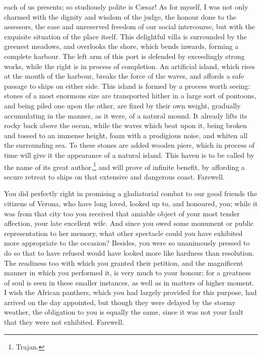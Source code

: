 each of us presents; so studiously polite is Cæsar! As for myself, I was
not only charmed with the dignity and wisdom of the judge, the honour done
to the assessors, the ease and unreserved freedom of our social
intercourse, but with the exquisite situation of the place itself. This
delightful villa is surrounded by the greenest meadows, and overlooks the
shore, which bends inwards, forming a complete harbour. The left arm of
this port is defended by exceedingly strong works, while the right is in
process of completion. An artificial island, which rises at the mouth of
the harbour, breaks the force of the waves, and affords a safe passage to
ships on either side. This island is formed by a process worth seeing:
stones of a most enormous size are transported hither in a large sort of
pontoons, and being piled one upon the other, are fixed by their own
weight, gradually accumulating in the manner, as it were, of a natural
mound. It already lifts its rocky back above the ocean, while the waves
which beat upon it, being broken and tossed to an immense height, foam
with a prodigious noise, and whiten all the surrounding sea. To these
stones are added wooden piers, which in process of time will give it the
appearance of a natural island. This haven is to be called by the name of
its great author,\footnote{Trajan.} and will prove of infinite benefit, by
affording a secure retreat to ships on that extensive and dangerous coast.
Farewell.


You did perfectly right in promising a gladiatorial combat to our good
friends the citizens of Verona, who have long loved, looked up to, and
honoured, you; while it was from that city too you received that amiable
object of your most tender affection, your late excellent wife. And since
you owed some monument or public representation to her memory, what other
spectacle could you have exhibited more appropriate to the occasion?
Besides, you were so unanimously pressed to do so that to have refused
would have looked more like hardness than resolution. The readiness too
with which you granted their petition, and the magnificent manner in which
you performed it, is very much to your honour; for a greatness of soul is
seen in these smaller instances, as well as in matters of higher moment. I
wish the African panthers, which you had largely provided for this
purpose, had arrived on the day appointed, but though they were delayed by
the stormy weather, the obligation to you is equally the same, since it
was not your fault that they were not exhibited. Farewell.

